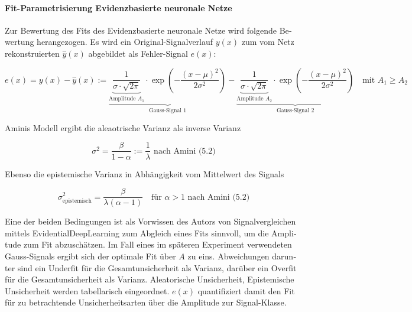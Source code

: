 \begin{otherlanguage}{ngerman}
\paragraph{Fit-Parametrisierung \gls{Evidenzbasierte neuronale Netze}} Zur Bewertung des Fits des \gls{Evidenzbasierte neuronale Netze} wird folgende Bewertung herangezogen. %
Es wird ein Original-Signalverlauf $y(x)$ zum vom Netz rekonstruierten $\hat{y}(x)$ abgebildet als Fehler-Signal $e(x)$: 

\[
e(x) = y(x) - \hat{y}(x) := 
\underbrace{
  \underbrace{\frac{1}{\sigma \cdot \sqrt{2\pi}}}_{\text{Amplitude } A_1}
  \cdot \exp\left( -\frac{(x - \mu)^2}{2\sigma^2} \right)
}_{\text{Gauss-Signal 1}}
- 
\underbrace{
  \underbrace{\frac{1}{\sigma \cdot \sqrt{2\pi}}}_{\text{Amplitude } A_2}
  \cdot \exp\left( -\frac{(x - \mu)^2}{2\sigma^2} \right)
}_{\text{Gauss-Signal 2}}
\quad \text{mit } A_1 \geq A_2
\]

Aminis Modell ergibt die aleaotrische Varianz als inverse Varianz 

\[
\sigma^{2} = \frac{\beta}{1 - \alpha} := \frac{1}{\lambda} \text{ nach Amini (5.2)}
\]

Ebenso die epistemische Varianz in Abhängigkeit vom Mittelwert des Signals

\[
\sigma^2_{\text{epistemisch}} = \frac{\beta}{\lambda(\alpha - 1)} \quad \text{für } \alpha > 1 \text{ nach Amini (5.2)}
\]

Eine der beiden Bedingungen ist als Vorwissen des Autors von Signalvergleichen mittels \gls{EvidentialDeepLearning} zum Abgleich eines Fits sinnvoll, um die Amplitude zum Fit abzuschätzen. Im Fall eines im späteren Experiment verwendeten Gauss-Signals ergibt sich der optimale Fit über $A$ zu eins. Abweichungen darunter sind ein Underfit für die Gesamtunsicherheit als Varianz, darüber ein Overfit für die Gesamtunsicherheit als Varianz. \gls{Aleatorische Unsicherheit}, \gls{Epistemische Unsicherheit} werden tabellarisch eingeordnet. $e(x)$ quantifiziert damit den Fit für zu betrachtende Unsicherheitsarten über die Amplitude zur Signal-Klasse. 


\end{otherlanguage}
